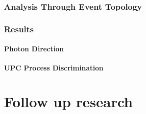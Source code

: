 \documentclass[a4paper,12pt,reqno]{article}
\begin{document}
\section{Analysis Through Event Topology}\label{sec:event_topology_ml}

\section{Results}
\subsection{Photon Direction}\label{sec:res_photon_direction}

\subsection{UPC Process Discrimination}\label{sec:res_sample_discrimination}


\pagebreak

\part{Follow up research}


\pagebreak
\printbibliography
\end{document}
